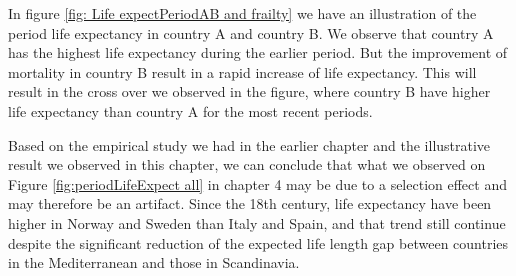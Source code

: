 In figure \ref{fig: Life expectPeriodAB and frailty} we have an illustration of the  period life expectancy in country A and country B. We observe that country A has the highest life expectancy during the earlier period. But the improvement of mortality in country B result in a rapid increase of life expectancy. This will result in the cross over we observed in the figure, where country B have higher life expectancy than country A for the most recent periods.


Based on the empirical study we had in the earlier chapter and the illustrative result we observed in this chapter, we can conclude that what we observed on Figure \ref{fig:periodLifeExpect all} in chapter 4 may be due to a selection effect and may therefore be an artifact. Since the 18th century, life expectancy have been higher in Norway and Sweden than Italy and Spain, and that trend still continue despite the significant reduction of the expected life length gap between countries in the Mediterranean and those in Scandinavia.

















 





